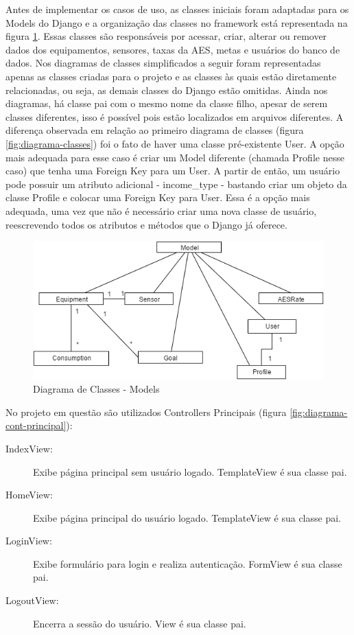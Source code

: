 Antes de implementar os casos de uso, as classes iniciais foram adaptadas para os Models do Django e a organização das classes no framework está representada na figura \ref{fig:diagrama-models}. Essas classes são responsáveis por acessar, criar, alterar ou remover dados dos equipamentos, sensores, taxas da AES, metas e usuários do banco de dados. Nos diagramas de classes simplificados a seguir foram representadas apenas as classes criadas para o projeto e as classes às quais estão diretamente relacionadas, ou seja, as demais classes do Django estão omitidas. Ainda nos diagramas, há classe pai com o mesmo nome da classe filho, apesar de serem classes diferentes, isso é possível pois estão localizados em arquivos diferentes. A diferença observada em relação ao primeiro diagrama de classes (figura \ref{fig:diagrama-classes}) foi o fato de haver uma classe pré-existente User. A opção mais adequada para esse caso é criar um Model diferente (chamada Profile nesse caso) que tenha uma Foreign Key para um User. A partir de então, um usuário pode possuir um atributo adicional - income\_type - bastando criar um objeto da classe Profile e colocar uma Foreign Key para User. Essa é a opção mais adequada, uma vez que não é necessário criar uma nova classe de usuário, reescrevendo todos os atributos e métodos que o Django já oferece.

\begin{figure}[H]
\centering
\includegraphics[width=14cm,keepaspectratio]{figuras/diagrama_models.png}
\caption{\label{fig:diagrama-models} Diagrama de Classes - Models}
\end{figure}

No projeto em questão são utilizados Controllers Principais (figura \ref{fig:diagrama-cont-principal}):
\begin{description}
	\item[IndexView:] Exibe página principal sem usuário logado. TemplateView é sua classe pai.
	\item[HomeView:] Exibe página principal do usuário logado. TemplateView é sua classe pai.
	\item[LoginView:] Exibe formulário para login e realiza autenticação. FormView é sua classe pai.
	\item[LogoutView:] Encerra a sessão do usuário.  View é sua classe pai.
\end{description} 

